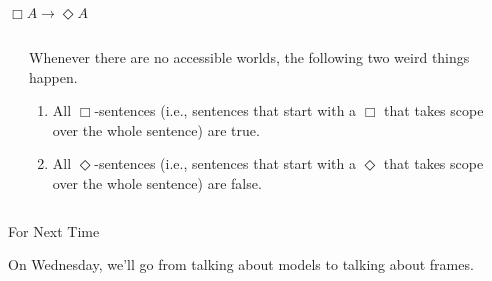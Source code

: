 \documentclass[
  ignorenonframetext,
]{beamer}
\renewcommand{\,}{\text{, }}
\begin{document}
\begin{frame}{\(\Box A \rightarrow \Diamond A\)}
\protect\hypertarget{box-a-rightarrow-diamond-a-1}{}

\begin{columns}
    \begin{column}{0.45\textwidth}
    \end{column}
    \begin{column}{0.5\textwidth}
    Whenever there are no accessible worlds, the following two weird things happen.
    \begin{enumerate}
    \item All $\Box$-sentences (i.e., sentences that start with a $\Box$ that takes scope over the whole sentence) are true.
    \item All $\Diamond$-sentences (i.e., sentences that start with a $\Diamond$ that takes scope over the whole sentence) are false.
    \end{enumerate}
   \end{column}
\end{columns}

\end{frame}

\begin{frame}{For Next Time}
\protect\hypertarget{for-next-time}{}

On Wednesday, we'll go from talking about models to talking about
frames.

\end{frame}
\end{document}
